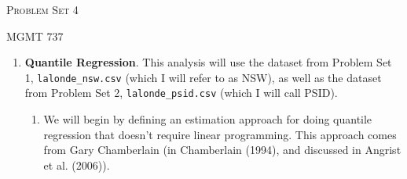 \documentclass[11pt, a4paper]{article}
\begin{document}
\begin{center}
  {\Large \textsc{Problem Set 4}}

  MGMT 737
\end{center}


\begin{enumerate}
\item \textbf{Quantile Regression}. This analysis will use the dataset
  from Problem Set 1, \texttt{lalonde\_nsw.csv} (which I will refer to
  as NSW), as well as the dataset from Problem Set 2,
  \texttt{lalonde\_psid.csv} (which I will call PSID).
  \begin{enumerate}
  \item We will begin by defining an estimation approach for doing
    quantile regression that doesn't require linear programming. This
    approach comes from Gary Chamberlain (in Chamberlain (1994), and
    discussed in Angrist et al. (2006)). 


\end{enumerate}
\end{enumerate}
\end{document}

